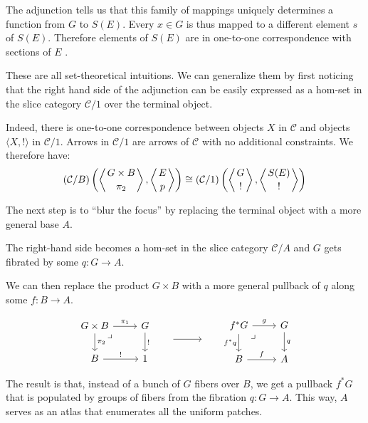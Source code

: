 \documentclass[DaoFP]{subfiles}
\begin{document}
The adjunction tells us that this family of mappings uniquely determines a function from $G$ to $S(E)$. Every $x \in G$ is thus mapped to a different element $s$ of $S(E)$. Therefore elements of $S(E)$ are in one-to-one correspondence with sections of $E$ .

These are all set-theoretical intuitions. We can generalize them by first noticing that the right hand side of the adjunction can be easily expressed as a hom-set in the slice category $\mathcal{C}/1$ over the terminal object. 

Indeed, there is one-to-one correspondence between objects $X$ in $\mathcal{C}$ and objects $\langle X, ! \rangle$ in  $\mathcal{C}/1$. Arrows in $\mathcal{C}/1$ are arrows of $\mathcal{C}$ with no additional constraints. We therefore have:
\[(\mathcal{C}/B) \left( \left \langle {G\times B \atop \pi_2} \right \rangle , \left \langle {E \atop p } \right \rangle \right) \cong (\mathcal{C}/1)  \left( \left \langle {G \atop !} \right \rangle , \left \langle {S(E) \atop ! } \right \rangle \right)  \]

The next step is to ``blur the focus'' by replacing the terminal object with a more general base $A$.

The right-hand side becomes a hom-set in the slice category $\mathcal{C}/A$ and $G$ gets fibrated by some $q \colon G \to A$. 

We can then replace the product $G \times B$ with a more general pullback of $q$ along some $f \colon B \to A$.

\[
 \begin{tikzcd}
 G \times B
 \arrow[dr, phantom,  , very near start, "\lrcorner"]
\arrow[d, "\pi_2"]
 \arrow[r, "\pi_1"]
 & G
 \arrow[d, "!"]
 \\
 B
 \arrow[r, "!"]
 &
 1
 \end{tikzcd}
 \hspace{20pt}
\begin{tikzpicture}
\draw[->] (0, 0) -- (1, 0);
\end{tikzpicture}
 \hspace{20pt}
 \begin{tikzcd}
 f^* G
\arrow[dr, phantom,  , very near start, "\lrcorner"]
 \arrow[d, "f^*q"']
 \arrow[r, "g"]
 & G
 \arrow[d, "q"]
 \\
 B
 \arrow[r, "f"]
 &A
\end{tikzcd}
\]

The result is that, instead of a bunch of $G$ fibers over $B$, we get a pullback $f^* G$ that is populated by groups of fibers from the fibration $q \colon G \to A$. This way, $A$ serves as an atlas that enumerates all the uniform patches. 
\end{document}
